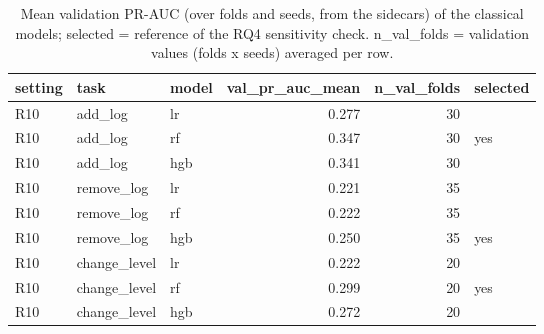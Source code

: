 \begin{table}[htbp]
\centering
\small
\caption{Mean validation PR-AUC (over folds and seeds, from the sidecars) of the classical models; selected = reference of the RQ4 sensitivity check. n\_val\_folds = validation values (folds x seeds) averaged per row.}
\label{tab:rq4_did_reference_validation_R10}
\begin{tabular}{lllrrl}
\toprule
setting & task & model & val\_pr\_auc\_mean & n\_val\_folds & selected \\
\midrule
R10 & add\_log & lr & 0.277 & 30 &  \\
R10 & add\_log & rf & 0.347 & 30 & yes \\
R10 & add\_log & hgb & 0.341 & 30 &  \\
R10 & remove\_log & lr & 0.221 & 35 &  \\
R10 & remove\_log & rf & 0.222 & 35 &  \\
R10 & remove\_log & hgb & 0.250 & 35 & yes \\
R10 & change\_level & lr & 0.222 & 20 &  \\
R10 & change\_level & rf & 0.299 & 20 & yes \\
R10 & change\_level & hgb & 0.272 & 20 &  \\
\bottomrule
\end{tabular}
\end{table}

